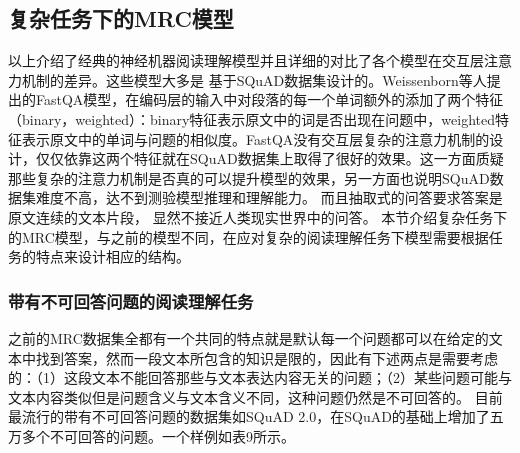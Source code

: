 \subsection{复杂任务下的MRC模型}
以上介绍了经典的神经机器阅读理解模型并且详细的对比了各个模型在交互层注意力机制的差异。这些模型大多是
基于SQuAD数据集设计的。Weissenborn等人提出的FastQA模型，在编码层的输入中对段落的每一个单词额外的添加了两个特征（binary，weighted）：binary特征表示原文中的词是否出现在问题中，weighted特征表示原文中的单词与问题的相似度。FastQA没有交互层复杂的注意力机制的设计，仅仅依靠这两个特征就在SQuAD数据集上取得了很好的效果。这一方面质疑那些复杂的注意力机制是否真的可以提升模型的效果，另一方面也说明SQuAD数据集难度不高，达不到测验模型推理和理解能力。
而且抽取式的问答要求答案是原文连续的文本片段，
显然不接近人类现实世界中的问答。
本节介绍复杂任务下的MRC模型，与之前的模型不同，在应对复杂的阅读理解任务下模型需要根据任务的特点来设计相应的结构。


\subsubsection{带有不可回答问题的阅读理解任务}\label{unknown}
之前的MRC数据集全都有一个共同的特点就是默认每一个问题都可以在给定的文本中找到答案，然而一段文本所包含的知识是限的，因此有下述两点是需要考虑的：（1）这段文本不能回答那些与文本表达内容无关的问题；（2）某些问题可能与文本内容类似但是问题含义与文本含义不同，这种问题仍然是不可回答的。
目前最流行的带有不可回答问题的数据集如SQuAD 2.0，在SQuAD的基础上增加了五万多个不可回答的问题。一个样例如表9所示。

